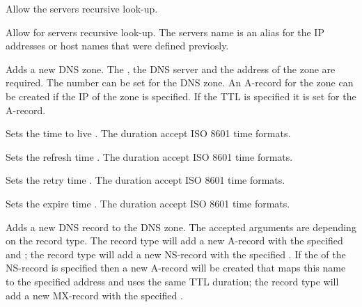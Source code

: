 Allow the servers recursive look-up.


Allow for servers  recursive look-up. The servers name is an alias
for the IP addresses or host names that were defined previosly.


Adds a new DNS zone. The , the  DNS server and 
the  address of the zone are required. The  number can
be set for the DNS zone.
An A-record for the zone
can be created if the IP  of the zone is specified. If the
TTL  is specified it is set for the A-record.


Sets the time to live . 
The duration accept ISO 8601 time formats.


Sets the refresh time .
The duration accept ISO 8601 time formats.


Sets the retry time .
The duration accept ISO 8601 time formats.


Sets the expire time .
The duration accept ISO 8601 time formats.


Adds a new DNS record to the DNS zone. 
The accepted arguments are depending on
the record type. The  record type will add a new A-record with the 
specified  and ; 
the  record type will add a 
new NS-record with the specified . If 
the  of the NS-record is specified then a new A-record will be 
created that maps this name to the specified address and uses the 
same TTL duration;
the  record type will add a 
new MX-record with the specified . 

